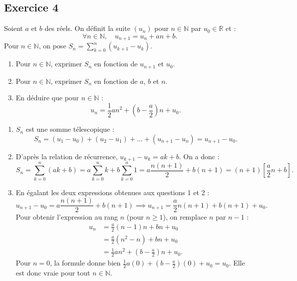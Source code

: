 \documentclass[11pt,a4paper]{article}
\newcommand{\N}{\mathbb{N}}
\newcommand{\R}{\mathbb{R}}
\begin{document}
\subsection*{Exercice 4}
Soient $a$ et $b$ des réels. On définit la suite $(u_n)$ pour $n \in \N$ par $u_0 \in \R$ et :
\[
\forall n \in \N, \quad u_{n+1} = u_n + an + b.
\]
Pour $n \in \N$, on pose $S_n = \sum_{k=0}^n (u_{k+1} - u_k)$.
\begin{enumerate}
    \item Pour $n \in \N$, exprimer $S_n$ en fonction de $u_{n+1}$ et $u_0$.
    \item Pour $n \in \N$, exprimer $S_n$ en fonction de $a$, $b$ et $n$.
    \item En déduire que pour $n \in \N$ :
    \[
    u_n = \frac{1}{2}a n^2 + \left(b - \frac{a}{2}\right)n + u_0.
    \]
\end{enumerate}

\begin{correctionbox}
\begin{enumerate}
    \item $S_n$ est une somme télescopique :
    \[
    S_n = (u_1 - u_0) + (u_2 - u_1) + \dots + (u_{n+1} - u_n) = u_{n+1} - u_0.
    \]
    \item D'après la relation de récurrence, $u_{k+1} - u_k = ak + b$. On a donc :
    \[
    S_n = \sum_{k=0}^n (ak + b) = a \sum_{k=0}^n k + b \sum_{k=0}^n 1 = a \frac{n(n+1)}{2} + b(n+1) = (n+1)\left[\frac{a}{2}n + b\right].
    \]
    \item En égalant les deux expressions obtenues aux questions 1 et 2 :
    \[
    u_{n+1} - u_0 = a \frac{n(n+1)}{2} + b(n+1) \implies u_{n+1} = \frac{a}{2}n(n+1) + b(n+1) + u_0.
    \]
    Pour obtenir l'expression au rang $n$ (pour $n \ge 1$), on remplace $n$ par $n-1$ :
    \begin{align*}
    u_n &= \frac{a}{2}(n-1)n + b n + u_0 \\
    &= \frac{a}{2}(n^2 - n) + bn + u_0 \\
    &= \frac{1}{2}an^2 + \left(b - \frac{a}{2}\right)n + u_0.
    \end{align*}
    Pour $n=0$, la formule donne bien $\frac{1}{2}a(0) + (b - \frac{a}{2})(0) + u_0 = u_0$. Elle est donc vraie pour tout $n \in \N$.
\end{enumerate}
\end{correctionbox}

\end{document}
